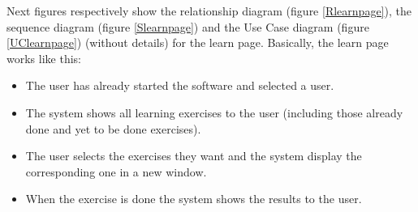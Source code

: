 Next figures respectively show the relationship diagram (figure \ref{Rlearnpage}), the sequence diagram (figure \ref{Slearnpage}) and the Use Case diagram (figure \ref{UClearnpage}) (without details) for the learn page. Basically, the learn page works like this:
\begin{itemize}
\item The user has already started the software and selected a user.
\item The system shows all learning exercises to the user (including those already done and yet to be done exercises).
\item The user selects the exercises they want and the system display the corresponding one in a new window.
\item When the exercise is done the system shows the results to the user.
\end{itemize}

